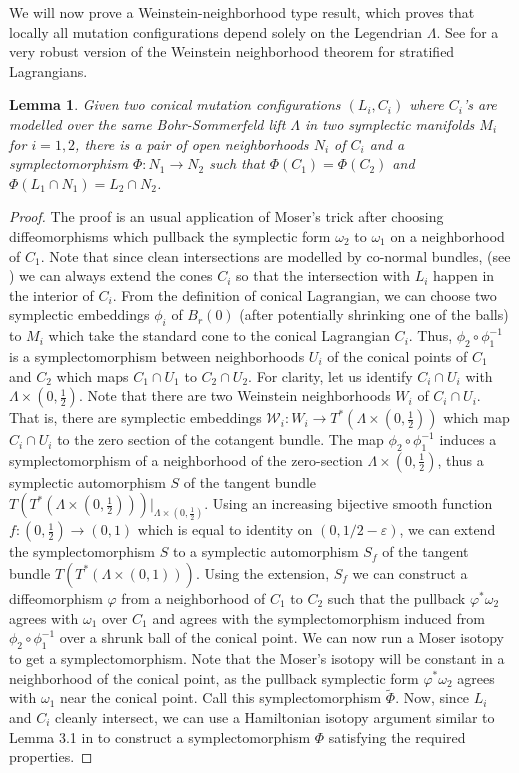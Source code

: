 \documentclass[11pt, oneside,dvipsnames]{amsart}
\newcommand{\of}{\circ}
\renewcommand{\to}{\rightarrow}
\newcommand{\inv}{^{-1}}
\newcommand{\wt}{\widetilde}
\renewcommand{\to}{\rightarrow}
\newcommand{\<}{\langle}
\renewcommand{\>}{\rangle}
\newcommand{\cW}{\mathcal{W}}
\renewcommand{\to}{\rightarrow}
\newtheorem{lemma}[Theorem]{Lemma}
\theoremstyle{definition}
\theoremstyle{definition}
\numberwithin{equation}{subsection}
\begin{document}
We will now prove a Weinstein-neighborhood type result, which proves that locally all mutation configurations depend solely on the Legendrian $\Lambda$. See \cite{karshon2025weinstein} for a very robust version of the Weinstein neighborhood theorem for stratified Lagrangians.

\begin{lemma}
    Given two conical mutation configurations $(L_i,C_i)$ where $C_i$'s are modelled over the same Bohr-Sommerfeld lift $\Lambda$ in two symplectic manifolds $M_i$ for $i= 1,2$, there is a pair of open neighborhoods $N_i$ of $C_i$ and a symplectomorphism $\Phi: N_1 \to N_2 $ such that $\Phi(C_1) = \Phi(C_2)$ and $\Phi(L_1 \cap N_1)  = L_2\cap N_2$.
\end{lemma}

\begin{proof}
    The proof is an usual application of Moser's trick after choosing diffeomorphisms which pullback the symplectic form $\omega_2$ to $\omega_1$ on a neighborhood of $C_1$. Note that since clean intersections are modelled by co-normal bundles, (see \cite[\S 3.2]{ciellat}) we can always extend the cones $C_i$ so that the intersection with $L_i$ happen in the interior of $C_i$. From the definition of conical Lagrangian, we can choose two symplectic embeddings $\phi_i$ of $B_r(0)$ (after potentially shrinking one of the balls) to $M_i$ which take the standard cone to the conical Lagrangian $C_i$. Thus, $\phi_2 \of \phi_1\inv$ is a symplectomorphism between neighborhoods  $U_i$ of the conical points of $C_1$ and $C_2$ which maps $C_1 \cap U_1 $ to $C_2 \cap U_2$. For clarity, let us identify $C_i \cap U_i$ with $\Lambda\times (0,\frac{1}{2})$. Note that there are two Weinstein neighborhoods $W_i$ of $C_i \cap U_i$. That is, there are symplectic embeddings $\cW_i: W_i \to T^*(\Lambda \times (0,\frac{1}{2}))$ which map $C_i\cap U_i$ to the zero section of the cotangent bundle. The map $\phi_2 \of \phi_1\inv$ induces a symplectomorphism of a neighborhood of the zero-section $\Lambda\times (0,\frac{1}{2})$, thus a symplectic automorphism $S$ of the tangent  bundle $T(T^*(\Lambda\times (0,\frac{1}{2})))|_{\Lambda\times (0,\frac{1}{2})}.$ Using an increasing  bijective smooth function $f:(0,\frac{1}{2})\to (0,1)$ which is equal to identity on $(0,1/2 - \varepsilon)$, we can extend the symplectomorphism $S$ to a symplectic automorphism $S_f$ of the tangent bundle $T(T^*(\Lambda\times (0,1)))$. Using the extension, $S_f$ we can construct a diffeomorphism $\varphi$ from a neighborhood of $C_1$ to $C_2$ such that the pullback $\varphi^*\omega_2$ agrees with $\omega_1$ over $C_1$ and agrees with the symplectomorphism induced from $\phi_2 \of \phi_1\inv $ over a shrunk ball of the conical point. We can now run a Moser isotopy to get a symplectomorphism. Note that the Moser's isotopy will be constant in a neighborhood of the conical point, as the pullback symplectic form $\varphi^*\omega_2$ agrees with $\omega_1$ near the conical point. Call this symplectomorphism $\wt\Phi$. Now, since $L_i$ and $C_i$ cleanly intersect, we can use a Hamiltonian isotopy argument similar to Lemma 3.1 in \cite{ciellat} to construct a symplectomorphism $\Phi$ satisfying the required properties.
\end{proof}
\end{document}
